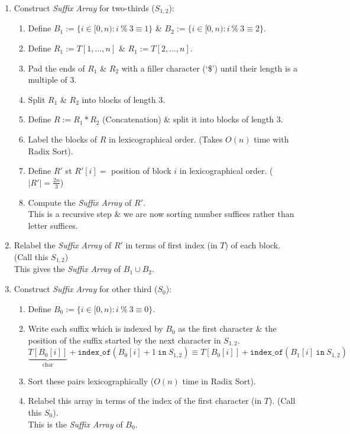 \documentclass[11pt,a4paper]{article}
\begin{document}
\begin{enumerate}
	\item Construct \textit{Suffix Array} for two-thirds ($S_{1,2}$):
	\begin{enumerate}
		\item Define $B_1:=\{i\in[0,n):i\ \%\ 3\equiv1\}$ \& $B_2:=\{i\in[0,n):i\ \%\ 3\equiv2\}$.
		\item Define $R_1:=T[1,\dots,n]$ \& $R_1:=T[2,\dots,n]$.
		\item Pad the ends of $R_1$ \& $R_2$ with a filler character (`\$') until their length is a multiple of 3.
		\item Split $R_1$ \& $R_2$ into blocks of length 3.
		\item Define $R:=R_1*R_2$ (Concatenation) \& split it into blocks of length 3.
		\item Label the blocks of $R$ in lexicographical order. (Takes $O(n)$ time with Radix Sort).
		\item Define $R'$ st $R'[i]=$ position of block $i$ in lexicographical order. (\nb $|R'|=\frac{2n}{3}$)
		\item Compute the \textit{Suffix Array} of $R'$.\\
		\nb This is a recursive step \& we are now sorting number suffices rather than letter suffices.
	\end{enumerate}
	\item Relabel the \textit{Suffix Array} of $R'$ in terms of first index (in $T$) of each block. (Call this $S_{1,2}$)\\
	\nb This gives the \textit{Suffix Array} of $B_1\cup B_2$.
	\item Construct \textit{Suffix Array} for other third ($S_0$):
	\begin{enumerate}
		\item Define $B_0:=\{i\in[0,n):i\ \%\ 3\equiv0\}$.
		\item Write each suffix which is indexed by $B_0$ as the first character \& the position of the suffix started by the next character in $S_{1,2}$.
		$$\underbrace{T[B_0[i]]}_\text{char}+\mathtt{index\_of}(B_0[i]+1\mathtt{\ in\ }S_{1,2})\equiv T[B_0[i]]+\mathtt{index\_of}(B_1[i]\mathtt{\ in\ }S_{1,2})$$
		\item Sort these pairs lexicographically ($O(n)$ time in Radix Sort).\\
		\item Relabel this array in terms of the index of the first character (in $T$). (Call this $S_0$).\\
		\nb This is the \textit{Suffix Array} of $B_0$.

\end{enumerate}
\end{enumerate}
\end{document}
